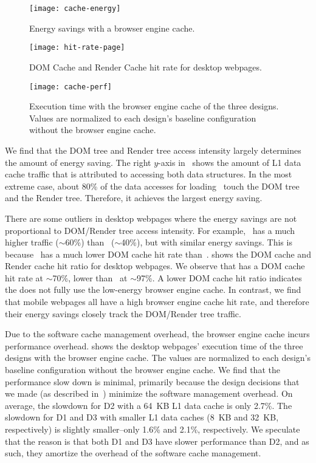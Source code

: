\begin{figure}[t]
\centering
\texttt{[image: cache-energy]}
\caption{Energy savings with a browser engine cache.}
\label{fig:cache-energy}
\end{figure}

\begin{figure}[t]
\centering
\texttt{[image: hit-rate-page]}
\caption{DOM Cache and Render Cache hit rate for desktop webpages.}
\label{fig:hit-rate-page}
\end{figure}

\begin{figure}[t]
\centering
\captionsetup{width=.9\columnwidth}
\texttt{[image: cache-perf]}
\caption{Execution time with the browser engine cache of the three designs. Values are normalized to each design's baseline configuration without the browser engine cache.}
\label{fig:cache-perf}
\end{figure}

We find that the DOM tree and Render tree access intensity largely determines the amount of energy saving. The right $y$-axis in~ shows the amount of L1 data cache traffic that is attributed to accessing both data structures. In the most extreme case, about 80\% of the data accesses for loading~ touch the DOM tree and the Render tree. Therefore, it achieves the largest energy saving.

There are some outliers in desktop webpages where the energy savings are not proportional to DOM/Render tree access intensity. For example,~ has a much higher traffic ($\sim$60\%) than~ ($\sim$40\%), but with similar energy savings. This is because~ has a much lower DOM cache hit rate than~.  shows the DOM cache and Render cache hit ratio for desktop webpages. We observe that  has a DOM cache hit rate at $\sim$70\%, lower than~ at $\sim$97\%. A lower DOM cache hit ratio indicates the  does not fully use the low-energy browser engine cache. In contrast, we find that mobile webpages all have a high browser engine cache hit rate, and therefore their energy savings closely track the DOM/Render tree traffic.

Due to the software cache management overhead, the browser engine cache incurs performance overhead.  shows the desktop webpages' execution time of the three designs with the browser engine cache. The values are normalized to each design's baseline configuration without the browser engine cache. We find that the performance slow down is minimal, primarily because the design decisions that we made (as described in~) minimize the software management overhead. On average, the slowdown for D2 with a 64~KB L1 data cache is only 2.7\%. The slowdown for D1 and D3 with smaller L1 data caches (8~KB and 32~KB, respectively) is slightly smaller--only 1.6\% and 2.1\%, respectively. We speculate that the reason is that both D1 and D3 have slower performance than D2, and as such, they amortize the overhead of the software cache management.

